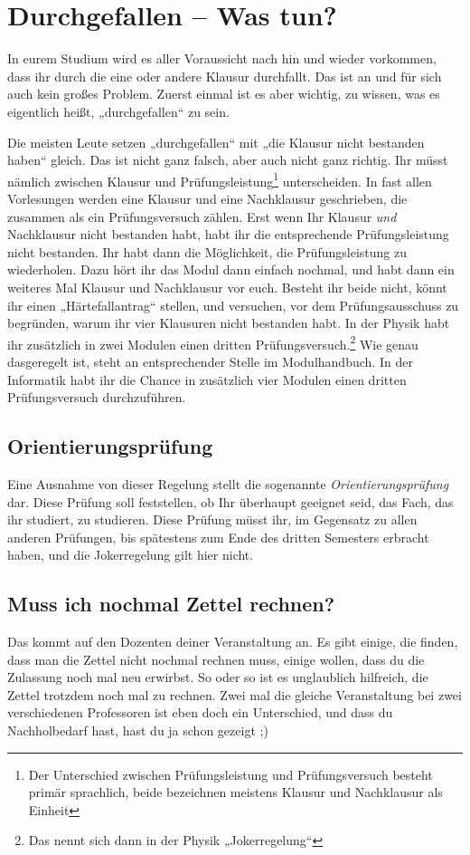 \section{Durchgefallen -- Was tun?}

In eurem Studium wird es aller Voraussicht nach hin und wieder vorkommen,
dass ihr durch die eine oder andere Klausur durchfallt.
Das ist an und für sich auch kein großes Problem. Zuerst einmal ist es aber
wichtig, zu wissen, was es eigentlich heißt, „durchgefallen“ zu sein.

Die meisten Leute setzen „durchgefallen“ mit „die Klausur nicht bestanden haben“
gleich. Das ist nicht ganz falsch, aber auch nicht ganz richtig. Ihr müsst
nämlich zwischen Klausur und Prüfungsleistung\footnote{ Der Unterschied zwischen
Prüfungsleistung und Prüfungsversuch besteht primär sprachlich, beide bezeichnen
meistens Klausur und Nachklausur als Einheit} unterscheiden.
In fast allen Vorlesungen werden eine Klausur und eine Nachklausur geschrieben,
die zusammen als ein Prüfungsversuch zählen. Erst wenn Ihr Klausur \emph{und}
Nachklausur nicht bestanden habt, habt ihr die entsprechende Prüfungsleistung
nicht bestanden. Ihr habt dann die Möglichkeit, die Prüfungsleistung zu
wiederholen. Dazu hört ihr das Modul dann einfach nochmal, und habt dann ein
weiteres Mal Klausur und Nachklausur vor euch. Besteht ihr beide nicht, könnt
ihr einen „Härtefallantrag“ stellen, und versuchen, vor dem Prüfungsausschuss
zu begründen, warum ihr vier Klausuren nicht bestanden habt. In der Physik habt
ihr zusätzlich in zwei Modulen einen dritten Prüfungsversuch.\footnote{Das nennt
sich dann in der Physik „Jokerregelung“} Wie genau dasgeregelt ist, steht an entsprechender Stelle im Modulhandbuch.
In der Informatik habt ihr die Chance in zusätzlich vier Modulen einen dritten Prüfungsversuch durchzuführen.

\subsection{Orientierungsprüfung}
Eine Ausnahme von dieser Regelung stellt die sogenannte \emph{Orientierungsprüfung} dar.
Diese Prüfung soll feststellen, ob Ihr überhaupt geeignet seid, das Fach, das
ihr studiert, zu studieren. Diese Prüfung müsst ihr, im Gegensatz zu allen
anderen Prüfungen, bis spätestens zum Ende des dritten Semesters erbracht haben,
und die Jokerregelung gilt hier nicht.

\subsection{Muss ich nochmal Zettel rechnen?}
Das kommt auf den Dozenten deiner Veranstaltung an. Es gibt einige, die finden,
dass man die Zettel nicht nochmal rechnen muss, einige wollen, dass du die
Zulassung noch mal neu erwirbst. So oder so ist es unglaublich hilfreich, die
Zettel trotzdem noch mal zu rechnen. Zwei mal die gleiche Veranstaltung bei zwei
verschiedenen Professoren ist eben doch ein Unterschied, und dass du
Nachholbedarf hast, hast du ja schon gezeigt ;)
